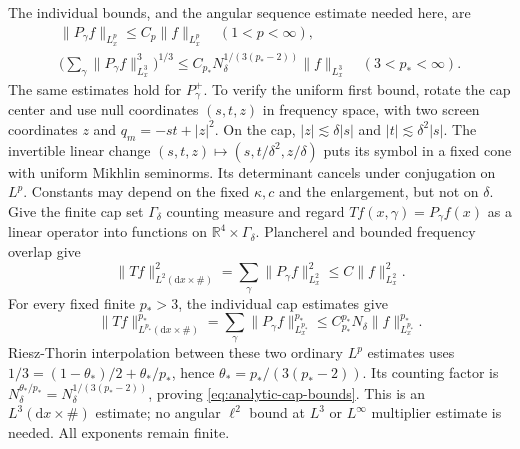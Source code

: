 \documentclass[11pt,a4paper]{article}
\numberwithin{equation}{section}
\newcommand{\dd}{\mathrm d}
\newcommand{\R}{\mathbb R}
\newcommand{\ls}{\lesssim}
\theoremstyle{definition}
\begin{document}
The individual bounds, and the angular sequence estimate needed here,
are
\begin{equation}\label{eq:analytic-cap-bounds}
\begin{gathered}
\|P_\gamma f\|_{L^p_x}\leq C_p\|f\|_{L^p_x}\quad(1<p<\infty),\\
\bigg(\sum_\gamma\|P_\gamma f\|_{L^3_x}^3\bigg)^{1/3}
\leq C_{p_*} N_\delta^{1/(3(p_*-2))}\|f\|_{L^3_x}
\quad(3<p_*<\infty).
\end{gathered}
\end{equation}
The same estimates hold for $P_\gamma^+$.
To verify the uniform first bound, rotate the cap center and use null
coordinates $(s,t,z)$ in frequency space, with two screen coordinates
$z$ and $q_m=-st+|z|^2$. On the cap,
$|z|\ls\delta|s|$ and $|t|\ls\delta^2|s|$.
The invertible linear change
$(s,t,z)\mapsto(s,t/\delta^2,z/\delta)$ puts its symbol in a fixed cone
with uniform Mikhlin seminorms. Its determinant cancels under conjugation
on $L^p$. Constants may depend on the fixed $\kappa,c$ and the enlargement,
but not on $\delta$. Give the finite cap set $\Gamma_\delta$ counting
measure and regard $Tf(x,\gamma)=P_\gamma f(x)$ as a linear operator
into functions on $\R^4\times\Gamma_\delta$. Plancherel and bounded
frequency overlap give
\begin{equation*}
\|Tf\|_{L^2(\dd x\times\#)}^2
=\sum_\gamma\|P_\gamma f\|_{L^2_x}^2\leq C\|f\|_{L^2_x}^2.
\end{equation*}
For every fixed finite $p_*>3$, the individual cap estimates give
\begin{equation*}
\|Tf\|_{L^{p_*}(\dd x\times\#)}^{p_*}
=\sum_\gamma\|P_\gamma f\|_{L^{p_*}_x}^{p_*}
\leq C_{p_*}^{p_*}N_\delta\|f\|_{L^{p_*}_x}^{p_*}.
\end{equation*}
Riesz-Thorin interpolation between these two ordinary $L^p$ estimates
uses $1/3=(1-\theta_*)/2+\theta_*/p_*$, hence
$\theta_*=p_*/(3(p_*-2))$. Its counting factor is
$N_\delta^{\theta_*/p_*}=N_\delta^{1/(3(p_*-2))}$, proving
\eqref{eq:analytic-cap-bounds}. This is an $L^3(\dd x\times\#)$
estimate; no angular $\ell^2$ bound at $L^3$ or $L^\infty$ multiplier
estimate is needed. All exponents remain finite.
\end{document}
